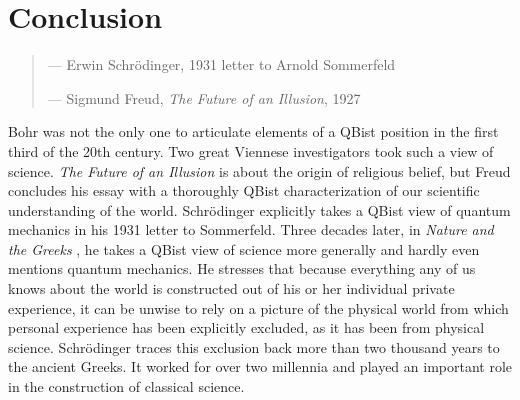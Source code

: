 \documentclass[aps,prb,superscriptaddress,12pt,tightenlines,nofootinbib]{revtex4-2}
\begin{document}
\section{Conclusion}

\begin{quote}

\hskip 10pt --- Erwin Schr\"odinger, 1931 letter to Arnold Sommerfeld \cite{Schroedinger1931}


\vskip  12pt


\hskip 10pt    --- Sigmund Freud,   {\it The Future of an Illusion}, 1927 \cite{Freud1927}

\end{quote}


Bohr was not the only one to articulate elements of a QBist position in the first third of the 20th century.  Two great Viennese investigators took such a  view of science.  {\it The Future of an Illusion}   is about the origin of religious belief, but Freud concludes his essay with a thoroughly QBist characterization of our scientific understanding of the world.   Schr\"odinger explicitly takes a QBist view of quantum mechanics in his 1931 letter to Sommerfeld.   Three decades later,  in {\it Nature and the Greeks} \cite{Schroedinger1951}, he takes a  QBist view of science more generally and hardly even mentions quantum mechanics.   He stresses that because everything any of us knows about the world is constructed out of his or her individual private experience,  it can be unwise to rely on a picture of the physical world from which personal experience has been explicitly excluded, as it has been from  physical science.  Schr\"odinger traces this exclusion back more than two thousand years to the ancient Greeks.  It worked for over two millennia and played an important role in the construction of classical science.
\end{document}
